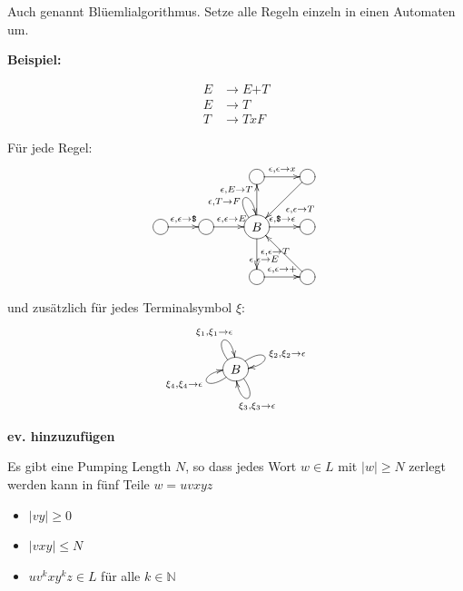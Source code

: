 \documentclass[a4paper]{article}
\begin{document}
	\begin{falgo}
	\begin{multicols}{3}

	Auch genannt Blüemlialgorithmus. Setze alle Regeln einzeln in einen Automaten um. \\\hspace{3mm}
	
	\textbf{Beispiel:}
	
	\begin{align*}
	E & \rightarrow E\texttt{+}T \\
	E & \rightarrow T \\
	T & \rightarrow TxF
	\end{align*}

	\columnbreak

	Für jede Regel:
	\begin{displaymath}
	\entrymodifiers={++[o][F]}
    \xymatrix{
        *+{}   & *+{}   & \ar[r]^{\epsilon,\epsilon \rightarrow x} & \ar[ld]^{\epsilon,\epsilon \rightarrow T} \\
        \ar[r]^{\epsilon, \epsilon \rightarrow \texttt{\$}} & \ar[r]^{\epsilon,\epsilon \rightarrow E } & B \ar@(ul,u)^{\epsilon, E\rightarrow T} \ar[r]^{\epsilon,\texttt{\$} \rightarrow \epsilon } \ar[u]^{\epsilon,T\rightarrow F\quad } \ar[d]^{\epsilon,\epsilon \rightarrow T } & \\
		*+{}   & *+{}   & \ar[r]^{\epsilon,\epsilon \rightarrow \texttt{$+$} } & \ar[lu]^{\epsilon,\epsilon \rightarrow E }      
    }
	\end{displaymath}
	
	\columnbreak

	und zusätzlich für jedes Terminalsymbol $\xi$:
	\begin{displaymath}
	\entrymodifiers={++[o][F]}
    \xymatrix{
    	B \ar@(lu,u)^{\xi_1,\xi_1 \rightarrow \epsilon}
    	  \ar@(ru,r)^{\xi_2,\xi_2 \rightarrow \epsilon}
    	  \ar@(rd,d)^{\xi_3,\xi_3 \rightarrow \epsilon}
    	  \ar@(ld,l)^{\xi_4,\xi_4 \rightarrow \epsilon}
    }
	\end{displaymath}
	\end{multicols}	
	\end{falgo}
	
	\begin{falgo}
	\textbf{ev. hinzuzufügen}
	\end{falgo}
	
	\begin{fdef}
	Es gibt eine Pumping Length $N$, so dass jedes Wort $w \in L$ mit $|w| \geq N$ zerlegt werden kann in fünf Teile $w = uvxyz$
	\begin{itemize}
		\item $|vy| \ge 0$
		\item $|vxy| \leq N$
		\item $uv^kxy^kz \in L$ für alle $k \in \mathbb{N}$
	\end{itemize}
	\end{fdef}
\end{document}
